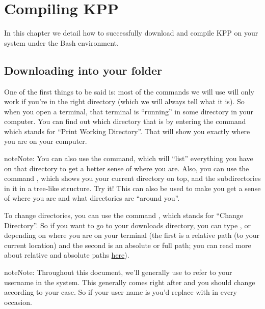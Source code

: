 \documentclass[letterpaper,10pt,openany,oneside]{sphinxmanual}
\begin{document}
\chapter{Compiling KPP}
\label{compiling::doc}\label{compiling:compiling-kpp}
In this chapter we detail how to successfully download and compile KPP
on your system under the Bash environment.


\section{Downloading into your folder}
\label{compiling:downloading-into-your-folder}
One of the first things to be said is: most of the commands we will use will
only work if you're in the right directory (which we will always tell what it
is). So when you open a terminal, that terminal is ``running'' in some directory
in your computer.  You can find out which directory that is by entering the
command  which stands for ``Print Working Directory''. That will show you
exactly where you are on your computer.

\begin{notice}{note}{Note:}
You can also use the  command, which will ``list'' everything you have on
that directory to get a better sense of where you are. Also, you can use the
command , which shows you your current directory on top, and
the subdirectories in it in a tree-like structure. Try it! This can also be used
to make you get a sense of where you are and what directories are ``around you''.
\end{notice}

To change directories, you can
use the command , which stands for ``Change Directory''. So if you want to
go to your downloads directory, you can type , or  depending on where you are on your terminal (the first
is a relative path (to your current location) and the second is an absolute or
full path; you can read more about relative and absolute paths \href{https://jeremywsherman.com/blog/2011/09/26/absolute-and-relative-paths/}{here}).

\begin{notice}{note}{Note:}
Throughout this document, we'll generally use  to refer to
your username in the system. This generally comes right after 
and you should change according to your case. So if your user name is 
you'd replace  with  in every occasion.
\end{notice}
\end{document}
